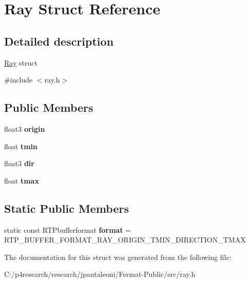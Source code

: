\hypertarget{struct_ray}{}\section{Ray Struct Reference}
\label{struct_ray}


\subsection{Detailed description}
\hyperlink{struct_ray}{Ray} struct 

{\ttfamily \#include $<$ray.\+h$>$}

\subsection*{Public Members}
\begin{DoxyCompactItemize}
\item 
\mbox{\label{struct_ray_a9583724df7a06756476d2285b1031206}} 
float3 {\bfseries origin}
\item 
\mbox{\label{struct_ray_a6a0a2346b82854fa203552c200bc654f}} 
float {\bfseries tmin}
\item 
\mbox{\label{struct_ray_adb316c7a3d9ec022ca0a75ded7a88611}} 
float3 {\bfseries dir}
\item 
\mbox{\label{struct_ray_a603b9ffee3760225c80b13eaf30c5441}} 
float {\bfseries tmax}
\end{DoxyCompactItemize}
\subsection*{Static Public Members}
\begin{DoxyCompactItemize}
\item 
\mbox{\label{struct_ray_a86ad6e312e298d1f0a5e4e6c3025d364}} 
static const R\+T\+Pbufferformat {\bfseries format} = R\+T\+P\+\_\+\+B\+U\+F\+F\+E\+R\+\_\+\+F\+O\+R\+M\+A\+T\+\_\+\+R\+A\+Y\+\_\+\+O\+R\+I\+G\+I\+N\+\_\+\+T\+M\+I\+N\+\_\+\+D\+I\+R\+E\+C\+T\+I\+O\+N\+\_\+\+T\+M\+AX
\end{DoxyCompactItemize}


The documentation for this struct was generated from the following file\+:\begin{DoxyCompactItemize}
\item 
C\+:/p4research/research/jpantaleoni/\+Fermat-\/\+Public/src/ray.\+h\end{DoxyCompactItemize}
